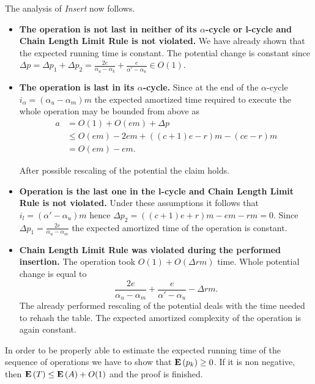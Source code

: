 The analysis of \emph{Insert} now follows.
\begin{itemize}
\item \textbf{The operation is not last in neither of its $\alpha$-cycle or l-cycle and Chain Length Limit Rule is not violated.}
We have already shown that the expected running time is constant. The potential change is constant since
$\Delta p = \Delta p_1 + \Delta p_2 = \frac{2e}{\alpha_u - \alpha_k} + \frac{e}{\alpha' - \alpha_u} \in O(1)$.

\item \textbf{The operation is last in its $\alpha$-cycle.} 
Since at the end of the $\alpha$-cycle $i_\alpha = (\alpha_u - \alpha_m)m$ the expected amortized time required to execute the whole operation may be bounded from above as
\[
\begin{split}
a
	& = O(1) + O(em) + \Delta p  \\
	& \leq O(em) - 2em + ((c + 1)e - r)m - (ce - r)m \\
	& = O(em) - em.
\end{split}
\]

After possible rescaling of the potential the claim holds.

\item \textbf{Operation is the last one in the l-cycle and Chain Length Limit Rule is not violated.} Under these assumptions it follows that $i_l = (\alpha' - \alpha_u)m$ hence $\Delta p_2 = ((c + 1)e + r)m - em - rm = 0$. Since $\Delta p_1 = \frac{2e}{\alpha_u - \alpha_m}$ the expected amortized time of the operation is constant.

\item \textbf{Chain Length Limit Rule was violated during the performed insertion.}
The operation took $O(1) + O(\Delta r m)$ time. Whole potential change is equal to \[ \frac{2e}{\alpha_u - \alpha_m} + \frac{e}{\alpha' - \alpha_u} - \Delta r m .\] The already performed rescaling of the potential deals with the time needed to rehash the table. The expected amortized complexity of the operation is again constant.
\end{itemize}

In order to be properly able to estimate the expected running time of the sequence of operations we have to show that $\mathbf{E}\left(p_k\right) \geq 0$. If it is non negative, then $\mathbf{E}\left(T\right) \leq \mathbf{E}\left(A\right) + O(1)$ and the proof is finished.

